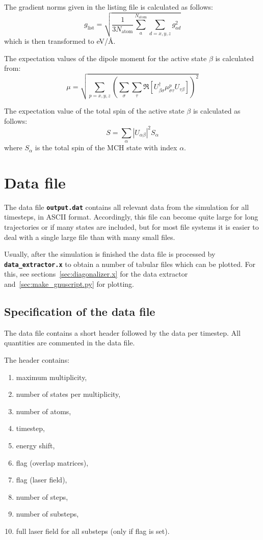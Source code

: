 \documentclass[a4paper,11pt,DIV=15,openany,twoside=false]{scrbook}
\newcommand{\ttt}[1]{\textbf{\texttt{#1}}}
\begin{document}
The gradient norms given in the listing file is calculated as follows:
\begin{equation}
  g_\text{list}=\sqrt{\frac{1}{3N_\text{atom}}\sum\limits_a^{N_\text{atom}}\sum_{d=x,y,z} g_{ad}^2}
\end{equation}
which is then transformed to eV/\AA.

The expectation values of the dipole moment for the active state $\beta$ is calculated from:
\begin{equation}
  \mu=\sqrt{\sum\limits_{p=x,y,z} 
  \left(
    \sum\limits_\sigma\sum\limits_\tau
    \Re\left[
      U_{\beta\sigma}^\dagger \mu_{\sigma\tau}^p U_{\tau\beta}
    \right]
  \right)^2}
\end{equation}

The expectation value of the total spin of the active state $\beta$ is calculated as follows:
\begin{equation}
  S=\sum_\alpha |U_{\alpha\beta}|^2 S_\alpha
\end{equation}
where $S_\alpha$ is the total spin of the MCH state with index $\alpha$.

\section{Data file}\label{sec:datfile}

The data file \ttt{output.dat} contains all relevant data from the simulation for all timesteps, in ASCII format. Accordingly, this file can become quite large for long trajectories or if many states are included, but for most file systems it is easier to deal with a single large file than with many small files.

Usually, after the simulation is finished the data file is processed by \ttt{data\_extractor.x} to obtain a number of tabular files which can be plotted. For this, see sections~\ref{sec:diagonalizer.x} for the data extractor and~\ref{sec:make_gnuscript.py} for plotting.

\subsection{Specification of the data file}

The data file contains a short header followed by the data per timestep. All quantities are commented in the data file.

The header contains:
\begin{enumerate}
  \item maximum multiplicity,
  \item number of states per multiplicity,
  \item number of atoms,
  \item timestep,
  \item energy shift,
  \item flag (overlap matrices),
  \item flag (laser field),
  \item number of steps,
  \item number of substeps,
  \item full laser field for all substeps (only if flag is set).
\end{enumerate}
\end{document}
